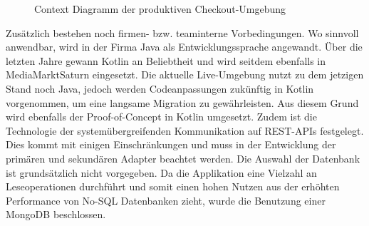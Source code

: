 \begin{figure}[htbp]
	\centering
	
	\caption{Context Diagramm der produktiven Checkout-Umgebung}
	\label{fig:ContextDiagramm}
\end{figure}

Zusätzlich bestehen noch firmen- bzw. teaminterne Vorbedingungen. Wo sinnvoll anwendbar, wird in der Firma Java als Entwicklungssprache angewandt. Über die letzten Jahre gewann Kotlin an Beliebtheit und wird seitdem ebenfalls in MediaMarktSaturn eingesetzt. Die aktuelle Live-Umgebung nutzt zu dem jetzigen Stand noch Java, jedoch werden Codeanpassungen zukünftig in Kotlin vorgenommen, um eine langsame Migration zu gewährleisten. Aus diesem Grund wird ebenfalls der Proof-of-Concept in Kotlin umgesetzt. Zudem ist die Technologie der systemübergreifenden Kommunikation auf REST-APIs festgelegt. Dies kommt mit einigen Einschränkungen und muss in der Entwicklung der primären und sekundären Adapter beachtet werden. Die Auswahl der Datenbank ist grundsätzlich nicht vorgegeben. Da die Applikation eine Vielzahl an Leseoperationen durchführt und somit einen hohen Nutzen aus der erhöhten Performance von No-SQL Datenbanken zieht, wurde die Benutzung einer MongoDB beschlossen.
